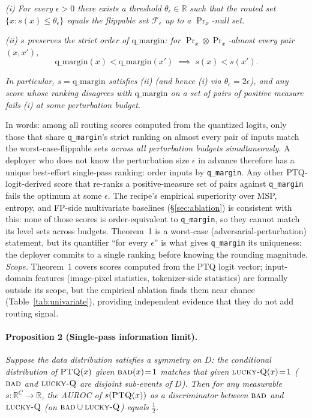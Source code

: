 \documentclass{article}
\newcommand{\ptq}{\textsc{PTQ}\xspace}
\newcommand{\bad}{\textsc{bad}\xspace}
\newcommand{\luckyq}{\textsc{lucky-Q}\xspace}
\begin{document}
\emph{(i) For every $\epsilon > 0$ there exists a threshold $\theta_\epsilon \in \mathbb R$ such that the routed set $\{x : s(x) \leq \theta_\epsilon\}$ equals the flippable set $\mathcal F_\epsilon$ up to a $\Pr_x$-null set.}

\emph{(ii) $s$ preserves the strict order of $\mathrm{q\_margin}$: for $\Pr_x \otimes \Pr_x$-almost every pair $(x, x')$,
\[
\mathrm{q\_margin}(x) < \mathrm{q\_margin}(x') \;\implies\; s(x) < s(x').
\]
}

\emph{In particular, $s = \mathrm{q\_margin}$ satisfies (ii) (and hence (i) via $\theta_\epsilon = 2\epsilon$), and any score whose ranking disagrees with $\mathrm{q\_margin}$ on a set of pairs of positive measure fails (i) at some perturbation budget.}

In words: among all routing scores computed from the quantized logits, only those that share \texttt{q\_margin}'s strict ranking on almost every pair of inputs match the worst-case-flippable sets \emph{across all perturbation budgets simultaneously}. A deployer who does not know the perturbation size $\epsilon$ in advance therefore has a unique best-effort single-pass ranking: order inputs by \texttt{q\_margin}. Any other \ptq-logit-derived score that re-ranks a positive-measure set of pairs against \texttt{q\_margin} fails the optimum at some $\epsilon$. The recipe's empirical superiority over MSP, entropy, and FP-side multivariate baselines (\S\ref{sec:ablation}) is consistent with this: none of those scores is order-equivalent to \texttt{q\_margin}, so they cannot match its level sets across budgets. Theorem~1 is a worst-case (adversarial-perturbation) statement, but its quantifier ``for every $\epsilon$'' is what gives \texttt{q\_margin} its uniqueness: the deployer commits to a single ranking before knowing the rounding magnitude. \emph{Scope.} Theorem~1 covers scores computed from the \ptq{} logit vector; input-domain features (image-pixel statistics, tokenizer-side statistics) are formally outside its scope, but the empirical ablation finds them near chance (Table~\ref{tab:univariate}), providing independent evidence that they do not add routing signal.

\paragraph{Proposition 2 (Single-pass information limit).}
\emph{Suppose the data distribution satisfies a symmetry on $D$: the conditional distribution of $\ptq(x)$ given $\bad(x)\!=\!1$ matches that given $\luckyq(x)\!=\!1$ ($\bad$ and $\luckyq$ are disjoint sub-events of $D$). Then for any measurable $s: \mathbb R^C \to \mathbb R$, the AUROC of $s(\ptq(x))$ as a discriminator between $\bad$ and $\luckyq$ (on $\bad \cup \luckyq$) equals $\tfrac12$.}
\end{document}
